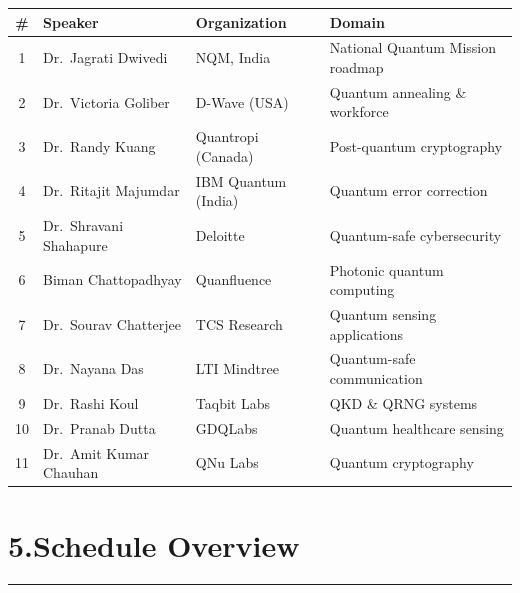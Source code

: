 \documentclass[12pt,a4paper]{article}
\begin{document}
\begin{table}[h!]
\centering
\small
\begin{tabularx}{\textwidth}{c l l X}
  \toprule
  \textbf{\#} & \textbf{Speaker} & \textbf{Organization} & \textbf{Domain} \\
  \midrule
  1  & Dr.\ Jagrati Dwivedi      & NQM, India          & National Quantum Mission roadmap \\
  2  & Dr.\ Victoria Goliber     & D-Wave (USA)        & Quantum annealing \& workforce \\
  3  & Dr.\ Randy Kuang          & Quantropi (Canada)  & Post-quantum cryptography \\
  4  & Dr.\ Ritajit Majumdar     & IBM Quantum (India) & Quantum error correction \\
  5  & Dr.\ Shravani Shahapure   & Deloitte             & Quantum-safe cybersecurity \\
  6  & Biman Chattopadhyay       & Quanfluence         & Photonic quantum computing \\
  7  & Dr.\ Sourav Chatterjee    & TCS Research        & Quantum sensing applications \\
  8  & Dr.\ Nayana Das           & LTI Mindtree        & Quantum-safe communication \\
  9  & Dr.\ Rashi Koul           & Taqbit Labs         & QKD \& QRNG systems \\
  10 & Dr.\ Pranab Dutta         & GDQLabs             & Quantum healthcare sensing \\
  11 & Dr.\ Amit Kumar Chauhan   & QNu Labs            & Quantum cryptography \\
  \bottomrule
\end{tabularx}
\end{table}

\section*{5.\quad Schedule Overview}
\vspace{-4pt}\hrule\vspace{6pt}
\end{document}
